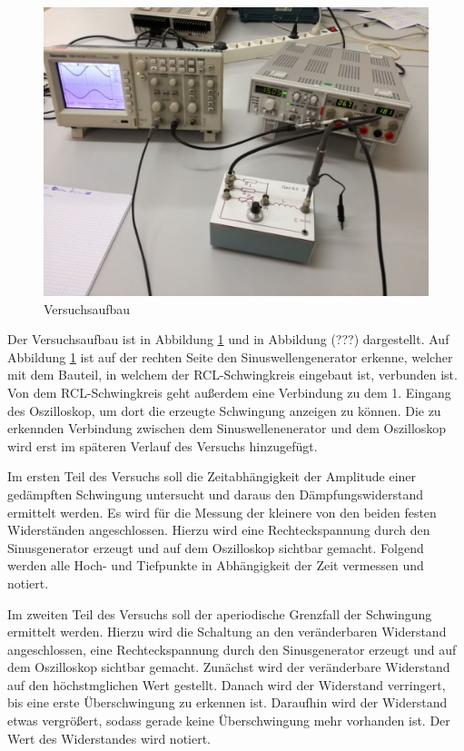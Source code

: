  \begin{figure}[h]
   \centering
   \includegraphics[scale=0.2]{V354Aufbau.jpeg}
   \caption{Versuchsaufbau}
   \label{AufbauBild}
 \end{figure}

Der Versuchsaufbau ist in Abbildung \ref{AufbauBild} und in Abbildung (???) dargestellt. Auf Abbildung \ref{AufbauBild} ist auf der rechten
Seite den Sinuswellengenerator erkenne, welcher mit dem Bauteil, in welchem der RCL-Schwingkreis eingebaut ist, verbunden
ist. Von dem RCL-Schwingkreis geht außerdem eine Verbindung zu dem 1. Eingang des Oszilloskop, um dort die erzeugte Schwingung
anzeigen zu können. Die zu erkennden Verbindung zwischen dem Sinuswellenenerator und dem Oszilloskop wird erst im späteren Verlauf
des Versuchs hinzugefügt.

Im ersten Teil des Versuchs soll die Zeitabhängigkeit der Amplitude einer gedämpften Schwingung untersucht und
daraus den Dämpfungswiderstand ermittelt werden. Es wird für die Messung der kleinere von den beiden festen Widerständen
angeschlossen. Hierzu wird eine Rechteckspannung durch den Sinusgenerator erzeugt
und auf dem Oszilloskop sichtbar gemacht. Folgend werden alle Hoch- und Tiefpunkte in Abhängigkeit der Zeit vermessen
und notiert.

Im zweiten Teil des Versuchs soll der aperiodische Grenzfall der Schwingung ermittelt werden. Hierzu wird die Schaltung
an den veränderbaren Widerstand angeschlossen, eine Rechteckspannung durch den Sinusgenerator erzeugt und auf dem
Oszilloskop sichtbar gemacht. Zunächst wird der veränderbare Widerstand auf den höchstmglichen Wert gestellt. Danach
wird der Widerstand verringert, bis eine erste Überschwingung zu erkennen ist. Daraufhin wird der Widerstand
etwas vergrößert, sodass gerade keine Überschwingung mehr vorhanden ist. Der Wert des Widerstandes wird notiert.


